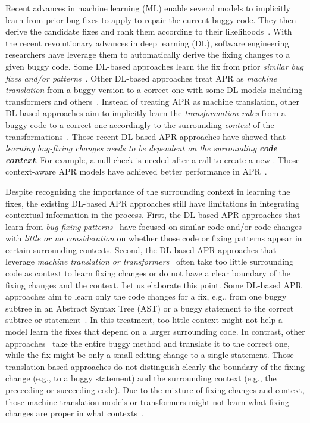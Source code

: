 Recent advances in machine learning (ML) enable several models to
implicitly learn from prior bug fixes to apply to repair the current
buggy code.  They then derive the candidate fixes and rank them
according to their
likelihoods~\cite{long2016automatic,long2017automatic,saha2017elixir}.
With the recent revolutionary advances in deep learning (DL), software
engineering researchers have leverage them to automatically derive the
fixing changes to a given buggy code. Some DL-based approaches learn
the fix from prior {\em similar bug fixes and/or
  patterns}~\cite{gupta2017deepfix,white2019sorting,white2016deep}.
Other DL-based approaches treat APR as {\em machine translation} from
a buggy version to a correct one with some DL models including
transformers and
others~\cite{chakrabortycodit,chen2018sequencer,hata2018learning,tufano2018empirical,see2017get}. Instead
of treating APR as machine translation, other DL-based approaches aim
to implicitly learn the {\em transformation rules} from a buggy code
to a correct one accordingly to the surrounding {\em context} of the
transformations~\cite{icse20,tufano2019learning,cure-icse21}. Those
recent DL-based APR approaches have showed that {\em learning
  bug-fixing changes needs to be dependent on the surrounding {\bf
    code context}}.  For example, a null check is needed after a call
to create a new .  Those context-aware APR models
have achieved better performance in
APR~\cite{icse20,tufano2019learning,chakrabortycodit}.

Despite recognizing the importance of the surrounding context in
learning the fixes, the existing DL-based APR approaches still have
limitations in integrating contextual information in the process.
First, the DL-based APR approaches that learn from {\em bug-fixing
  patterns}~\cite{white2016deep,gupta2017deepfix} have focused on
similar code and/or code changes with {\em little or no consideration}
on whether those code or fixing patterns appear in certain surrounding
contexts. Second, the DL-based APR approaches that leverage {\em
  machine translation or
  transformers}~\cite{chakrabortycodit,chen2018sequencer,hata2018learning,tufano2018empirical,see2017get}
often take too little surrounding code as context to learn fixing
changes or do not have a clear boundary of the fixing changes and the
context. Let us elaborate this point. Some DL-based APR approaches aim
to learn only the code changes for a fix, e.g., from one buggy subtree
in an Abstract Syntax Tree (AST) or a buggy statement to the correct
subtree or statement~\cite{chakrabortycodit,hata2018learning}. In this
treatment, too little context might not help a model learn the fixes
that depend on a larger surrounding code. In contrast, other
approaches~\cite{chen2018sequencer,hata2018learning} take the entire
buggy method and translate it to the correct one, while the fix might
be only a small editing change to a single statement. Those
translation-based approaches do not distinguish clearly the boundary
of the fixing change (e.g., to a buggy statement) and the surrounding
context (e.g., the preceeding or succeeding code). Due to the mixture
of fixing changes and context, those machine translation models or
transformers might not learn what fixing changes are proper in what
contexts~\cite{icse20}.

